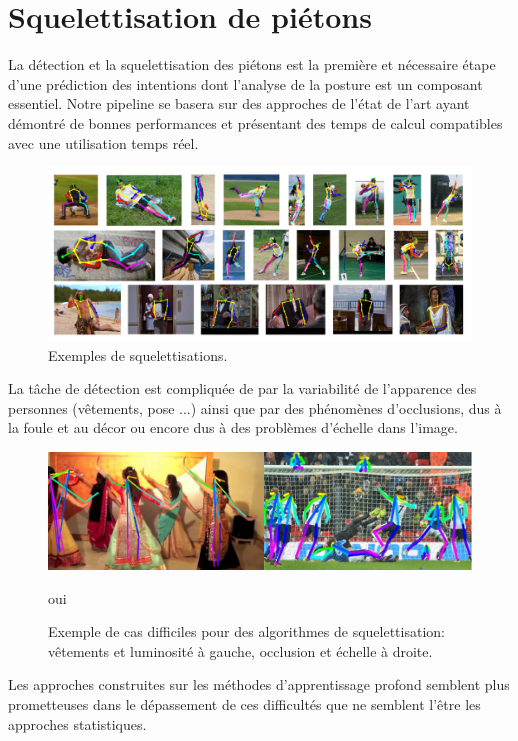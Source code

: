 \section{Squelettisation de piétons}

La détection et la squelettisation des piétons est la première et nécessaire étape d'une prédiction des intentions dont l'analyse de la posture est un composant essentiel.
Notre pipeline se basera sur des approches de l’état de l’art ayant démontré de bonnes performances et présentant
des temps de calcul compatibles avec une utilisation temps réel.


\begin{figure}[H]
    \centering
    \includegraphics[width=0.9\linewidth]{Images/pose_estim_example.png}
    \caption{Exemples de squelettisations.}
    \label{fig:difficulte}
\end{figure}


La tâche de détection est compliquée de par la variabilité de l’apparence des personnes (vêtements, pose ...)
ainsi que par des phénomènes d’occlusions, dus à la foule et au décor ou encore dus à des problèmes d'échelle dans l'image.\\


\begin{figure}[H]
    \centering
    \includegraphics[width=0.85\linewidth]{Images/Difficulties.png}
    \caption{Exemple de cas difficiles pour des algorithmes de squelettisation: vêtements et luminosité à gauche, occlusion et échelle à droite.}oui
    \label{fig:difficulte}
\end{figure}
Les approches construites sur les méthodes d'apprentissage profond semblent plus prometteuses dans le dépassement de ces difficultés que ne  semblent l'être les approches statistiques. \\


